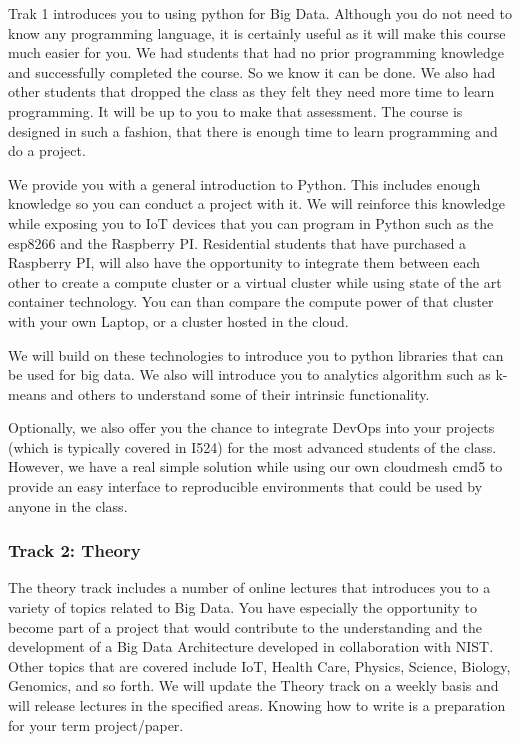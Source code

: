 Trak 1 introduces you to using python for Big Data. Although you do not
need to know any programming language, it is certainly useful as it will
make this course much easier for you. We had students that had no prior
programming knowledge and successfully completed the course. So we know
it can be done. We also had other students that dropped the class as
they felt they need more time to learn programming. It will be up to you
to make that assessment. The course is designed in such a fashion, that
there is enough time to learn programming and do a project.

We provide you with a general introduction to Python. This includes
enough knowledge so you can conduct a project with it. We will reinforce
this knowledge while exposing you to IoT devices that you can program in
Python such as the esp8266 and the Raspberry PI. Residential students
that have purchased a Raspberry PI, will also have the opportunity to
integrate them between each other to create a compute cluster or a
virtual cluster while using state of the art container technology. You
can than compare the compute power of that cluster with your own Laptop,
or a cluster hosted in the cloud.

We will build on these technologies to introduce you to python libraries
that can be used for big data. We also will introduce you to analytics
algorithm such as k-means and others to understand some of their
intrinsic functionality.

Optionally, we also offer you the chance to integrate DevOps into your
projects (which is typically covered in I524) for the most advanced
students of the class. However, we have a real simple solution while
using our own cloudmesh cmd5 to provide an easy interface to
reproducible environments that could be used by anyone in the class.

\subsubsection{Track 2: Theory}

The theory track includes a number of online lectures that introduces
you to a variety of topics related to Big Data. You have especially the
opportunity to become part of a project that would contribute to the
understanding and the development of a Big Data Architecture developed
in collaboration with NIST. Other topics that are covered include IoT,
Health Care, Physics, Science, Biology, Genomics, and so forth. We will
update the Theory track on a weekly basis and will release lectures in
the specified areas. Knowing how to write is a preparation for your term
project/paper.


